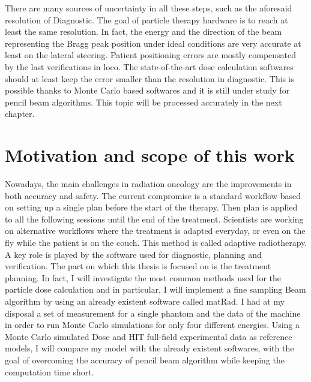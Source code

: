 \documentclass[12pt, a4paper, twoside]{book}
\begin{document}
There are many sources of uncertainty in all these steps, such as the aforesaid resolution of Diagnostic. The goal of particle therapy hardware is to reach at least the same resolution. In fact, the energy and the direction of the beam representing the Bragg peak position under ideal conditions are very accurate at least on the lateral steering.
Patient positioning errors are mostly compensated by the last verifications in loco.
The state-of-the-art dose calculation softwares should at least keep the error smaller than the resolution in diagnostic. This is possible thanks to Monte Carlo based softwares and it is still under study for pencil beam algorithms. This topic will be processed accurately in the next chapter.



\section{Motivation and scope of this work} 
Nowadays, the main challenges in radiation oncology are the improvements in both accuracy and safety. 
The current compromise is a standard workflow based on setting up a single plan before the start of the therapy. Then plan is applied to all the following sessions until the end of the treatment.
Scientists are working on alternative workflows where the treatment is adapted everyday, or even on the fly while the patient is on the couch. This method is called adaptive radiotherapy.
A key role is played by the software used for diagnostic, planning and verification.
The part on which this thesis is focused on is the treatment planning. In fact, I will investigate the most common methods used for the particle dose calculation and in particular, I will implement a fine sampling Beam algorithm by using an already existent software called matRad. 
I had at my disposal a set of measurement for a single phantom and the data of the machine in order to run Monte Carlo simulations for only four different energies.
Using a Monte Carlo simulated Dose and HIT full-field experimental data as reference models, I will compare my model with the already existent softwares, with the goal of overcoming the accuracy of pencil beam algorithm while keeping the computation time short.  
\end{document}
